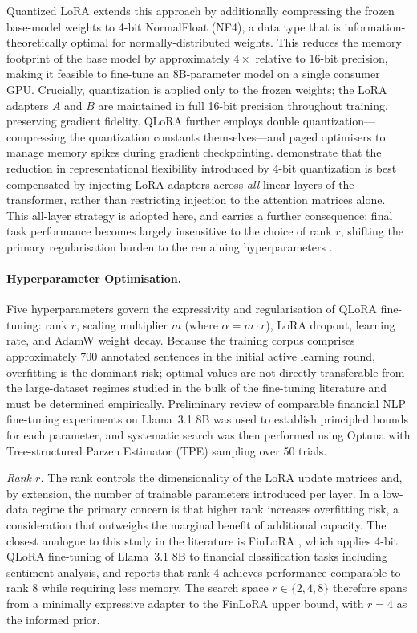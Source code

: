 Quantized LoRA \citep[QLoRA;][]{dettmers2023qlora} extends this approach by
additionally compressing the frozen base-model weights to 4-bit NormalFloat
(NF4), a data type that is information-theoretically optimal for
normally-distributed weights. This reduces the memory footprint of the base
model by approximately $4\times$ relative to 16-bit precision, making it
feasible to fine-tune an 8B-parameter model on a single consumer GPU.
Crucially, quantization is applied only to the frozen weights; the LoRA
adapters $A$ and $B$ are maintained in full 16-bit precision throughout
training, preserving gradient fidelity. QLoRA further employs double
quantization---compressing the quantization constants themselves---and paged
optimisers to manage memory spikes during gradient checkpointing.
\citet{dettmers2023qlora} demonstrate that the reduction in representational
flexibility introduced by 4-bit quantization is best compensated by injecting
LoRA adapters across \emph{all} linear layers of the transformer, rather than
restricting injection to the attention matrices alone. This all-layer strategy
is adopted here, and carries a further consequence: final task performance
becomes largely insensitive to the choice of rank $r$, shifting the primary
regularisation burden to the remaining hyperparameters
\citep{dettmers2023qlora}.

\paragraph{Hyperparameter Optimisation.}

Five hyperparameters govern the expressivity and regularisation of QLoRA
fine-tuning: rank $r$, scaling multiplier $m$ (where $\alpha = m \cdot r$),
LoRA dropout, learning rate, and AdamW weight decay. Because the training
corpus comprises approximately 700 annotated sentences in the initial active
learning round, overfitting is the dominant risk; optimal values are not
directly transferable from the large-dataset regimes studied in the bulk of the
fine-tuning literature and must be determined empirically. Preliminary review of
comparable financial NLP fine-tuning experiments on Llama~3.1 8B was used to
establish principled bounds for each parameter, and systematic search was then
performed using Optuna \citep{akiba2019optuna} with Tree-structured Parzen
Estimator (TPE) sampling over 50 trials.

\textit{Rank $r$.}
The rank controls the dimensionality of the LoRA update matrices and, by
extension, the number of trainable parameters introduced per layer. In a
low-data regime the primary concern is that higher rank increases overfitting
risk, a consideration that outweighs the marginal benefit of additional
capacity. The closest analogue to this study in the literature is FinLoRA
\citep{finlora2024}, which applies 4-bit QLoRA fine-tuning of Llama~3.1 8B to
financial classification tasks including sentiment analysis, and reports that
rank 4 achieves performance comparable to rank 8 while requiring less memory.
The search space $r \in \{2, 4, 8\}$ therefore spans from a minimally
expressive adapter to the FinLoRA upper bound, with $r = 4$ as the informed
prior.

